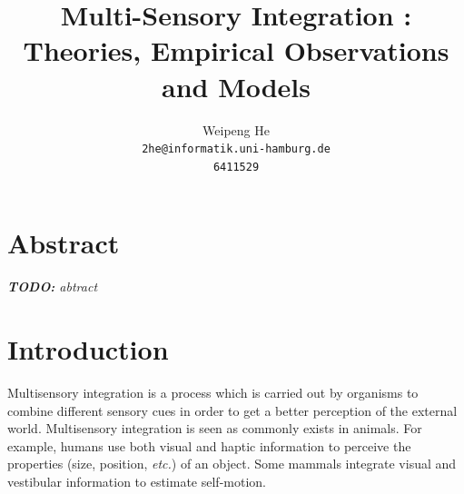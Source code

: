 \documentclass{article}[11pt]
\title{Multi-Sensory Integration : Theories, Empirical Observations and Models}
\author{Weipeng He \\ \texttt{2he@informatik.uni-hamburg.de} \\ \texttt{6411529}}
\newcommand{\TODO}[1]{\emph{\small{{\bf TODO: } #1}}}
\newcommand{\etc}{\textit{etc.}}
\begin{document}
\maketitle

\section*{Abstract}
\TODO{abtract}


\section{Introduction}
\label{sec:intro}

Multisensory integration is a process which is carried out by organisms to combine different sensory cues in order to get a better perception of the external world. 
Multisensory integration is seen as commonly exists in animals. For example, humans use both visual and haptic information to perceive the properties (size, position, \etc) of an object\cite{ernst_humans_2002}. Some mammals integrate visual and vestibular information to estimate self-motion\cite{fetsch_dynamic_2009}.
\end{document}
